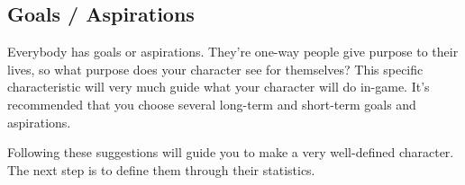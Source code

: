 \subsection{Goals / Aspirations} \label{subsec:goals_aspirations}

Everybody has goals or aspirations. They’re one-way people give purpose to their lives, so what purpose does your character see for themselves? This specific characteristic will very much guide what your character will do in-game. It’s recommended that you choose several long-term and short-term goals and aspirations.

Following these suggestions will guide you to make a very well-defined character. The next step is to define them through their statistics.